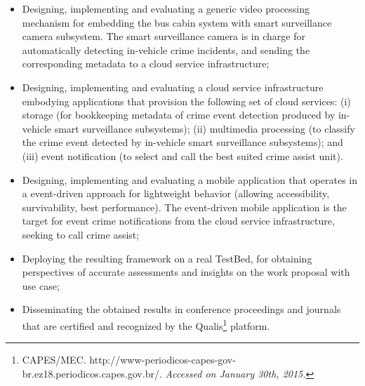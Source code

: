 \begin{itemize}
\item Designing, implementing and evaluating a generic video processing mechanism for embedding the bus cabin system with smart surveillance camera subsystem. The smart surveillance camera is in charge for automatically detecting in-vehicle crime incidents, and sending the corresponding metadata to a cloud service infrastructure;
\item Designing, implementing and evaluating a cloud service infrastructure embodying applications that provision the following set of cloud services: (i) storage (for bookkeeping metadata of crime event detection produced by in-vehicle smart surveillance subsystems); (ii) multimedia processing (to classify the crime event detected by in-vehicle smart surveillance subsystems); and (iii) event notification (to select and call the best suited crime assist unit).
\item Designing, implementing and evaluating a mobile application that operates in a event-driven approach for lightweight behavior (allowing accessibility, survivability, best performance). The event-driven mobile application is the target for event crime notifications from the cloud service infrastructure, seeking to call crime assist;
\item Deploying the resulting framework on a real TestBed, for obtaining perspectives of accurate assessments and insights on the work proposal with use case;
\item Disseminating the obtained results in conference proceedings and journals that are certified and recognized by the Qualis\footnote[7]{CAPES/MEC. http://www-periodicos-capes-gov-br.ez18.periodicos.capes.gov.br/. \textit{Accessed on  January 30th, 2015.}} platform.
\end{itemize}

